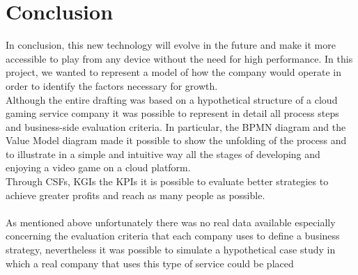 \documentclass[a4paper,12pt]{report}
\begin{document}
\chapter{Conclusion}
In conclusion, this new technology will evolve in the future and make it more accessible to play from any device without the need for high performance. 
In this project, we wanted to represent a model of how the company would operate in order to identify the factors necessary for growth.\\
Although the entire drafting was based on a hypothetical structure of a cloud gaming service company it was possible to represent in detail all process steps and business-side evaluation criteria. In particular, the BPMN diagram and the Value Model diagram made it possible to show the unfolding of the process and to illustrate in a simple and intuitive way all the stages of developing and enjoying a video game on a cloud platform.\\
Through CSFs, KGIs the KPIs it is possible to evaluate better strategies to achieve greater profits and reach as many people as possible.\\\\
%
As mentioned above unfortunately there was no real data available especially concerning the evaluation criteria that each company uses to define a business strategy, nevertheless it was possible to simulate a hypothetical case study in which a real company that uses this type of service could be placed
\end{document}
